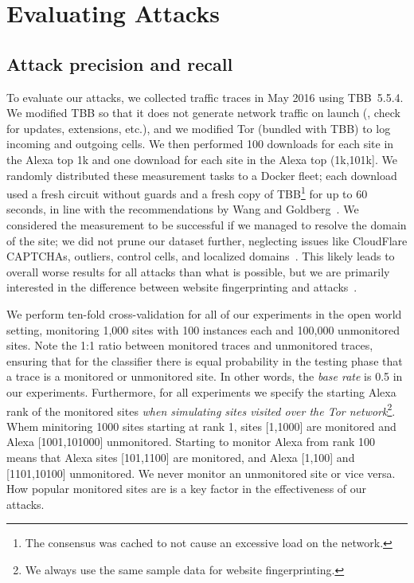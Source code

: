 \section{Evaluating \name Attacks}
\label{sec:analysis}

\subsection{Attack precision and recall}

To evaluate our \name attacks, we collected traffic traces in May
2016 using TBB~5.5.4.
We modified TBB so that it does not generate network traffic on launch
(\ie, check for
updates, extensions, etc.), and we modified
Tor (bundled with TBB) to log incoming and outgoing cells.
We then performed 100 downloads for each site in the Alexa top
1k and one download for each site in the
Alexa top (1k,101k]. We randomly distributed these measurement tasks
to a Docker fleet; each download used a fresh circuit without
guards and a fresh copy of TBB\footnote{The consensus was cached to not
cause an excessive load on the network.} for up to 60 seconds,
in line with the recommendations by Wang and Goldberg~\cite{Wang2013a}.
We considered the measurement to be successful if we managed to resolve
the domain of the site;
we did not prune our dataset further, neglecting issues like CloudFlare
CAPTCHAs, outliers, control cells, and localized domains~\cite{Juarez2014a}.
This likely leads to overall worse results for all attacks than what is
possible, but we are primarily interested in the difference between website
fingerprinting and \name attacks~\cite{Wang2013a}.

We perform ten-fold cross-validation for all of our experiments in the open
world setting, monitoring 1,000 sites with 100 instances each and
100,000 unmonitored sites.
Note the 1:1 ratio between monitored traces and unmonitored traces,
ensuring that for the classifier there is equal probability in the testing
phase that a trace is a monitored or unmonitored site.
In other words, the \emph{base rate} is 0.5 in our experiments.
Furthermore, for all experiments we specify the starting Alexa rank of the
monitored sites
\emph{when simulating sites visited over the Tor network}\footnote{We always
use the same sample data for website fingerprinting.}.
Whem minitoring 1000 sites starting at rank 1, sites
[1,1000] are monitored and Alexa [1001,101000] unmonitored. Starting to
monitor Alexa from rank 100 means that Alexa sites [101,1100] are monitored,
and Alexa [1,100] and [1101,10100] unmonitored.
We never monitor an unmonitored site or vice versa.
How popular monitored sites
are is a key factor in the effectiveness of our attacks.

